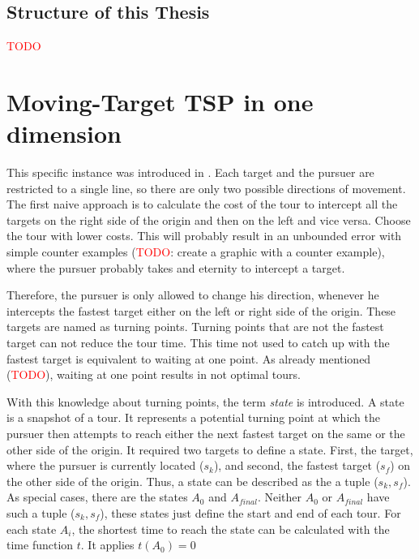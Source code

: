 \documentclass[english,version-2019-07]{uzl-thesis}
\begin{document}
\section{Structure of this Thesis}


%

\textcolor{red}{TODO}




%

\chapter{Moving-Target TSP in one dimension}%
\label{chapter-use}

This specific instance was introduced in \cite{helvig}. Each target and the pursuer are restricted to a single line, so there are only two possible directions of movement. The first naive approach is to calculate the cost of the tour to intercept all the targets on the right side of the origin and then on the left and vice versa. Choose the tour with lower costs. This will probably result in an unbounded error with simple counter examples (\textcolor{red}{TODO}: create a graphic with a counter example), where the pursuer probably takes and eternity to intercept a target.

Therefore, the pursuer is only allowed to change his direction, whenever he intercepts the fastest target either on the left or right side of the origin. These targets are named as turning points. Turning points that are not the fastest target can not reduce the tour time. This time not used to catch up with the fastest target is equivalent to waiting at one point. As already mentioned (\textcolor{red}{TODO}), waiting at one point results in not optimal tours. 

With this knowledge about turning points, the term \emph{state} is introduced. A state is a snapshot of a tour. It represents a potential turning point at which the pursuer then attempts to reach either the next fastest target on the same or the other side of the origin. It required two targets to define a state. First, the target, where the pursuer is currently located ($s_k$), and second, the fastest target ($s_f$) on the other side of the origin. Thus, a state can be described as the a tuple ($s_k, s_f$). As special cases, there are the states $A_0$ and $A_{final}$. Neither $A_0$ or $A_{final}$ have such a tuple ($s_k, s_f$), these states just define the start and end of each tour. For each state $A_i$, the shortest time to reach the state can be calculated with the time function $t$. It applies $t(A_0) = 0$
\end{document}

